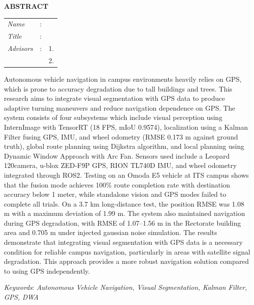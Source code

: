 \begin{center}
  \large\textbf{ABSTRACT}
\end{center}


\vspace{2ex}

\begingroup
\setlength{\tabcolsep}{0pt}

\noindent
\begin{tabularx}{\textwidth}{l >{\centering}m{3em} X}
  \emph{Name}     & : & \name{}         \\

  \emph{Title}    & : & \engtatitle{}   \\

  \emph{Advisors} & : & 1. \advisor{}   \\
                  &   & 2. \coadvisor{} \\
\end{tabularx}
\endgroup

\begin{sloppypar}
Autonomous vehicle navigation in campus environments heavily relies on GPS, which is prone to accuracy degradation due to tall buildings and trees.
This research aims to integrate visual segmentation with GPS data to produce adaptive turning maneuvers and reduce navigation dependence on GPS.
The system consists of four subsystems which include visual perception using InternImage with TensorRT (18 FPS, mIoU 0.9574), localization using a Kalman Filter fusing GPS, IMU, and wheel odometry (RMSE 0.173 m against ground truth), global route planning using Dijkstra algorithm, and local planning using Dynamic Window Approach with Arc Fan.
Sensors used include a Leopard 120\textdegree camera, u-blox ZED-F9P GPS, RION TL740D IMU, and wheel odometry integrated through ROS2.
Testing on an Omoda E5 vehicle at ITS campus shows that the fusion mode achieves 100\% route completion rate with destination accuracy below 1 meter, while standalone vision and GPS modes failed to complete all trials.
On a 3.7 km long-distance test, the position RMSE was 1.08 m with a maximum deviation of 1.99 m.
The system also maintained navigation during GPS degradation, with RMSE of 1.07--1.56 m in the Rectorate building area and 0.705 m under injected gaussian noise simulation.
The results demonstrate that integrating visual segmentation with GPS data is a necessary condition for reliable campus navigation, particularly in areas with satellite signal degradation.
This approach provides a more robust navigation solution compared to using GPS independently.
\end{sloppypar}

\emph{Keywords}: \emph{Autonomous Vehicle Navigation, Visual Segmentation, Kalman Filter, GPS, DWA}
